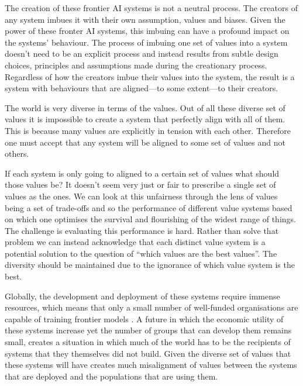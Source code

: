 
The creation of these frontier AI systems is not a neutral process. The creators of any system imbues it with their own assumption, values and biases. Given the power of these fronter AI systems, this imbuing can have a profound impact on the systems' behaviour. The process of imbuing one set of values into a system doesn't need to be an explicit process and instead results from subtle design choices, principles and assumptions made during the creationary process. Regardless of how the creators imbue their values into the system, the result is a system with behaviours that are aligned—to some extent—to their creators.

The world is very diverse in terms of the values. Out of all these diverse set of values it is impossible to create a system that perfectly align with all of them. This is because many values are explicitly in tension with each other. Therefore one must accept that any system will be aligned to some set of values and not others. 

If each system is only going to aligned to a certain set of values what should those values be? It doesn't seem very just or fair to prescribe a single set of values as the  ones. We can look at this unfairness through the lens of values being a set of trade-offs and so the performance of different value systems based on which one optimises the survival and flourishing of the widest range of things. The challenge is evaluating this performance is hard. Rather than solve that problem we can instead acknowledge that each distinct value system is a potential solution to the question of ``which values are the best values''. The diversity should be maintained due to the ignorance of which value system is the best. 

Globally, the development and deployment of these systems require immense resources, which means that only a small number of well-funded organisations are capable of training frontier models \cite{cottierRisingCostsTraining2024}. A future in which the economic utility of these systems increase yet the number of groups that can develop them remains small, creates a situation in which much of the world has to be the recipients of systems that they themselves did not build. Given the diverse set of values that these systems will have creates much misalignment of values between the systems that are deployed and the populations that are using them.

